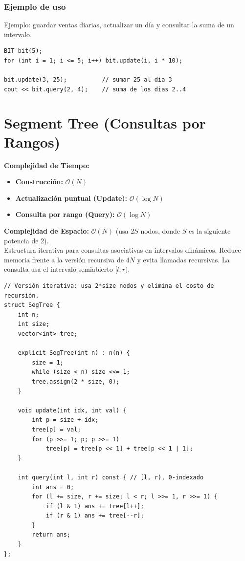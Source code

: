 \documentclass[10pt,twocolumn,letterpaper]{report}
\begin{document}
\subsubsection*{Ejemplo de uso}
Ejemplo: guardar ventas diarias, actualizar un día y consultar la suma de un intervalo.
\begin{lstlisting}
BIT bit(5);
for (int i = 1; i <= 5; i++) bit.update(i, i * 10);

bit.update(3, 25);          // sumar 25 al dia 3
cout << bit.query(2, 4);    // suma de los dias 2..4
\end{lstlisting}

\section{Segment Tree (Consultas por Rangos)}
\textbf{Complejidad de Tiempo:}
\begin{itemize}
    \item \textbf{Construcción:} $\mathcal{O}(N)$
    \item \textbf{Actualización puntual (Update):} $\mathcal{O}(\log N)$
    \item \textbf{Consulta por rango (Query):} $\mathcal{O}(\log N)$
\end{itemize}
\textbf{Complejidad de Espacio:} $\mathcal{O}(N)$ (usa $2S$ nodos, donde $S$ es la siguiente potencia de 2). \\
Estructura iterativa para consultas asociativas en intervalos dinámicos. Reduce memoria frente a la versión recursiva de $4N$ y evita llamadas recursivas. La consulta usa el intervalo semiabierto $[l,r)$.
\begin{lstlisting}
// Versión iterativa: usa 2*size nodos y elimina el costo de recursión.
struct SegTree {
    int n;
    int size;
    vector<int> tree;

    explicit SegTree(int n) : n(n) {
        size = 1;
        while (size < n) size <<= 1;
        tree.assign(2 * size, 0);
    }

    void update(int idx, int val) {
        int p = size + idx;
        tree[p] = val;
        for (p >>= 1; p; p >>= 1)
            tree[p] = tree[p << 1] + tree[p << 1 | 1];
    }

    int query(int l, int r) const { // [l, r), 0-indexado
        int ans = 0;
        for (l += size, r += size; l < r; l >>= 1, r >>= 1) {
            if (l & 1) ans += tree[l++];
            if (r & 1) ans += tree[--r];
        }
        return ans;
    }
};
\end{lstlisting}
\end{document}
